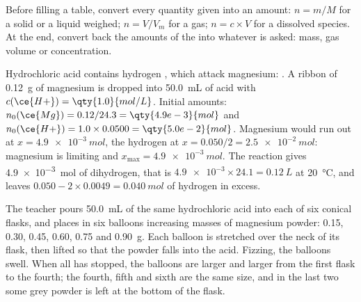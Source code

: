 \begin{method}\label{met:g10:reaction-progress-table:amounts}
Before filling a table, convert every quantity given into an amount:
$n = m/M$ for a solid or a liquid weighed; $n = V/V_m$ for a gas;
$n = c \times V$ for a dissolved species. At the end, convert back the
amounts of the  into whatever is asked: mass, gas volume or
concentration.
\end{method}

\begin{example}\label{ex:g10:reaction-progress-table:magnesium}
Hydrochloric acid contains hydrogen  , which attack magnesium:
. A ribbon of \qty{0.12}{g} of magnesium is
dropped into \qty{50.0}{mL} of acid with $c(\ce{H+}) = \qty{1.0}{mol/L}$.
Initial amounts: $n_0(\ce{Mg}) = 0.12/24.3 = \qty{4.9e-3}{mol}$ and
$n_0(\ce{H+}) = 1.0 \times 0.0500 = \qty{5.0e-2}{mol}$. Magnesium would
run out at $x = \qty{4.9e-3}{mol}$, the hydrogen  at
$x = 0.050/2 = \qty{2.5e-2}{mol}$: magnesium is limiting and
$x_{\max} = \qty{4.9e-3}{mol}$. The reaction gives \qty{4.9e-3}{mol} of
dihydrogen, that is $\num{4.9e-3} \times 24.1 = \qty{0.12}{L}$ at
\qty{20}{\celsius}, and leaves $0.050 - 2 \times 0.0049 =
\qty{0.040}{mol}$ of hydrogen  in excess.
\end{example}

\begin{inthelab}
The teacher pours \qty{50.0}{mL} of the same hydrochloric acid into each
of six conical flasks, and places in six balloons increasing masses of
magnesium powder: 0.15, 0.30, 0.45, 0.60, 0.75 and \qty{0.90}{g}. Each
balloon is stretched over the neck of its flask, then lifted so that
the powder falls into the acid. Fizzing, the balloons swell. When all
has stopped, the balloons are larger and larger from the first flask to
the fourth; the fourth, fifth and sixth are the same size, and in the
last two some grey powder is left at the bottom of the flask.
\end{inthelab}

